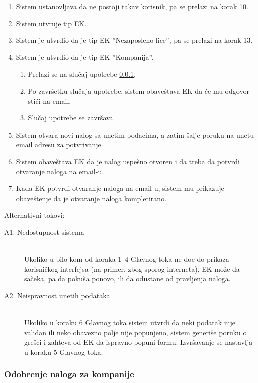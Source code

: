 \begin{enumerate}
	\item Sistem ustanovljava da ne postoji takav korisnik, pa se prelazi na korak 10.
	\item Sistem utvr\dj uje tip EK.
	\item Sistem je utvrdio da je tip EK ''Nezaposleno lice'', pa se prelazi na korak 13.
	\item Sistem je utvrdio da je tip EK ''Kompanija''.
	\begin{enumerate}
		\item Prelazi se na slu\v caj upotrebe \ref{su: odobrenje naloga za kompanije}.
		\item Po zavr\v setku slu\v caja upotrebe, sistem obave\v stava EK da \' ce mu odgovor sti\' ci na email.
		\item Slu\v caj upotrebe se zavr\v sava.
	\end{enumerate}
	\item Sistem otvara novi nalog sa unetim podacima, a zatim \v salje poruku na unetu email adresu za potvr\dj ivanje.
	\item Sistem obave\v stava EK da je nalog uspe\v sno otvoren i da treba da potvrdi otvaranje naloga na email-u.
	\item Kada EK potvrdi otvaranje naloga na email-u, sistem mu prikazuje obave\v stenje da je otvaranje naloga kompletirano.
\end{enumerate}

\noindent Alternativni tokovi: 
\begin{description}
	\item[A1. Nedostupnost sistema] ~\\
	Ukoliko u bilo kom od koraka 1--4 Glavnog toka ne do\dj e do prikaza korisni\v ckog interfejsa (na primer, zbog sporog interneta), EK mo\v ze da sa\v ceka, pa da poku\v sa ponovo, ili da odustane od pravljenja naloga.
	
	\item[A2. Neispravnost unetih podataka] ~\\
	Ukoliko u koraku 6 Glavnog toka sistem utvrdi da neki podatak nije validan ili neko obavezno polje nije popunjeno, sistem generi\v se poruku o gre\v sci i zahteva od EK da ispravno popuni formu. Izvr\v savanje se nastavlja u koraku 5 Glavnog toka.
\end{description}

\subsubsection{Odobrenje naloga za kompanije}
\label{su: odobrenje naloga za kompanije}

